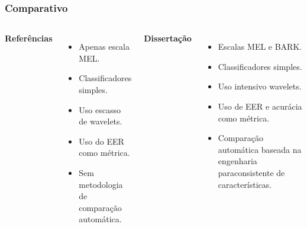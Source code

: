 \begin{frame}
	\frametitle{Comparativo}
		\begin{columns}
				\par \textbf{Referências}
				\begin{itemize}
					\item Apenas escala MEL.
					\item Classificadores simples.
					\item Uso escasso de wavelets.
					\item Uso do EER como métrica.
					\item Sem metodologia de comparação automática.
				\end{itemize}
				\par \textbf{Dissertação}
				\begin{itemize}
					\item Escalas MEL e BARK.
					\item Classificadores simples.
					\item Uso intensivo wavelets.
					\item Uso de EER e acurácia como métrica.
					\item Comparação automática baseada na engenharia paraconsistente de características.
				\end{itemize}
		\end{columns}
\end{frame}